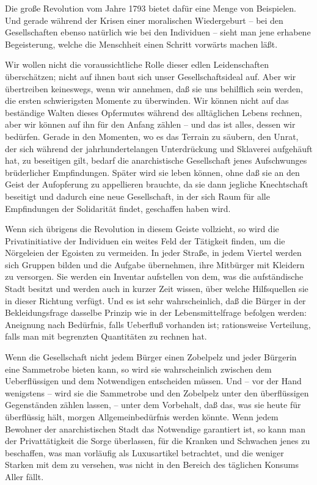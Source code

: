 \documentclass{scrbook}
\begin{document}
Die große Revolution vom Jahre 1793 bietet dafür eine Menge von Beispielen. Und gerade während der Krisen einer moralischen Wiedergeburt – bei den Gesellschaften ebenso natürlich wie bei den Individuen – sieht man jene erhabene Begeisterung, welche die Menschheit einen Schritt vorwärts machen läßt.

Wir wollen nicht die voraussichtliche Rolle dieser edlen Leidenschaften überschätzen; nicht auf ihnen baut sich unser Gesellschaftsideal auf. Aber wir übertreiben keineswegs, wenn wir annehmen, daß sie uns behilflich sein werden, die ersten schwierigsten Momente zu überwinden. Wir können nicht auf das beständige Walten dieses Opfermutes während des alltäglichen Lebens rechnen, aber wir können auf ihn für den Anfang zählen – und das ist alles, dessen wir bedürfen. Gerade in den Momenten, wo es das Terrain zu säubern, den Unrat, der sich während der jahrhundertelangen Unterdrückung und Sklaverei aufgehäuft hat, zu beseitigen gilt, bedarf die anarchistische Gesellschaft jenes Aufschwunges brüderlicher Empfindungen. Später wird sie leben können, ohne daß sie an den Geist der Aufopferung zu appellieren brauchte, da sie dann jegliche Knechtschaft beseitigt und dadurch eine neue Gesellschaft, in der sich Raum für alle Empfindungen der Solidarität findet, geschaffen haben wird.

Wenn sich übrigens die Revolution in diesem Geiste vollzieht, so wird die Privatinitiative der Individuen ein weites Feld der Tätigkeit finden, um die Nörgeleien der Egoisten zu vermeiden. In jeder Straße, in jedem Viertel werden sich Gruppen bilden und die Aufgabe übernehmen, ihre Mitbürger mit Kleidern zu versorgen. Sie werden ein Inventar aufstellen von dem, was die aufständische Stadt besitzt und werden auch in kurzer Zeit wissen, über welche Hilfsquellen sie in dieser Richtung verfügt. Und es ist sehr wahrscheinlich, daß die Bürger in der Bekleidungsfrage dasselbe Prinzip wie in der Lebensmittelfrage befolgen werden: Aneignung nach Bedürfnis, falls Ueberfluß vorhanden ist; rationsweise Verteilung, falls man mit begrenzten Quantitäten zu rechnen hat.

Wenn die Gesellschaft nicht jedem Bürger einen Zobelpelz und jeder Bürgerin eine Sammetrobe bieten kann, so wird sie wahrscheinlich zwischen dem Ueberflüssigen und dem Notwendigen entscheiden müssen. Und – vor der Hand wenigstens – wird sie die Sammetrobe und den Zobelpelz unter den überflüssigen Gegenständen zählen lassen, – unter dem Vorbehalt, daß das, was sie heute für überflüssig hält, morgen Allgemeinbedürfnis werden könnte. Wenn jedem Bewohner der anarchistischen Stadt das Notwendige garantiert ist, so kann man der Privattätigkeit die Sorge überlassen, für die Kranken und Schwachen jenes zu beschaffen, was man vorläufig als Luxusartikel betrachtet, und die weniger Starken mit dem zu versehen, was nicht in den Bereich des täglichen Konsums Aller fällt.
\end{document}

